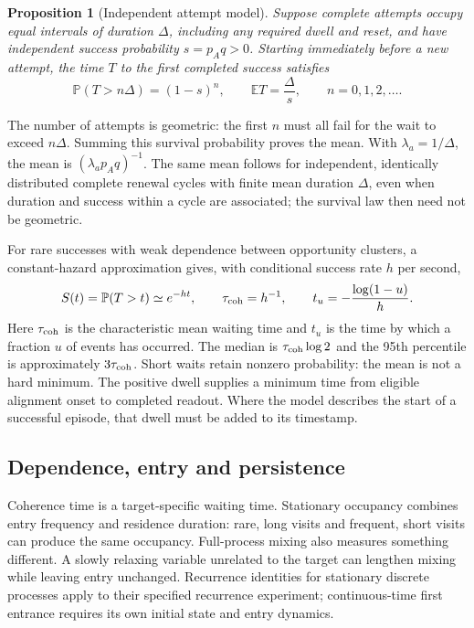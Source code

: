 \documentclass[11pt]{article}
\newtheorem{proposition}{Proposition}
\newcommand{\E}{\mathbb{E}}
\newcommand{\Prob}{\mathbb{P}}
\begin{document}
\begin{proposition}[Independent attempt model]
Suppose complete attempts occupy equal intervals of duration $\Delta$,
including any required dwell and reset, and have independent success
probability $s=p_Aq>0$. Starting immediately before a new attempt, the time
$T$ to the first completed success satisfies
\begin{equation}
 \Prob(T>n\Delta)=(1-s)^n,\qquad
 \E T=\frac{\Delta}{s},\qquad n=0,1,2,\ldots.
 \label{eq:geometric}
\end{equation}
\end{proposition}
\noindent
The number of attempts is geometric: the first $n$ must all fail for the
wait to exceed $n\Delta$. Summing this survival probability proves the
mean. With $\lambda_a=1/\Delta$, the mean is
$(\lambda_a p_Aq)^{-1}$. The same mean follows for independent,
identically distributed complete renewal cycles with finite mean
duration $\Delta$, even when duration and success within a cycle are
associated; the survival law then need not be geometric.

For rare successes with weak dependence between opportunity clusters,
a constant-hazard approximation gives, with conditional success rate
$h$ per second,
\begin{equation}
 S(t)=\Prob(T>t)\simeq e^{-ht},\qquad
 \tau_{\rm coh}=h^{-1},\qquad
 t_u=-\frac{\log(1-u)}{h}.
 \label{eq:survival}
\end{equation}
Here $\tau_{\rm coh}$ is the characteristic mean waiting time and $t_u$
is the time by which a fraction $u$ of events has occurred. The median
is $\tau_{\rm coh}\log 2$ and the 95th percentile is approximately
$3\tau_{\rm coh}$. Short waits retain nonzero probability: the mean
is not a hard minimum. The positive dwell supplies a minimum time from eligible
alignment onset to completed readout. Where the model describes the
start of a successful episode, that dwell must be added to its timestamp.

\subsection{Dependence, entry and persistence}

Coherence time is a target-specific waiting time. Stationary occupancy
combines entry frequency and residence duration: rare, long visits and
frequent, short visits can produce the same occupancy. Full-process
mixing also measures something different. A slowly relaxing variable
unrelated to the target can lengthen mixing while leaving entry unchanged.
Recurrence identities for stationary discrete processes \cite{kac1947}
apply to their specified recurrence experiment; continuous-time first
entrance requires its own initial state and entry dynamics.
\end{document}
